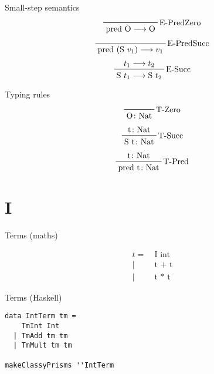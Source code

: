 \documentclass{beamer}
\begin{document}

\begin{frame}[c]
  Small-step semantics
  \begin{displaymath}  
    \prftree[r]{E-PredZero}
    {\text{pred O} \longrightarrow \text{O}}
  \end{displaymath}  
  \begin{displaymath}  
    \prftree[r]{E-PredSucc}
    {\text{pred (S $v_1$)} \longrightarrow \text{$v_1$}}
  \end{displaymath}  
  \begin{displaymath}  
    \prftree[r]{E-Succ}
    {t_1 \longrightarrow t_2}
    {\text{S $t_1$} \longrightarrow \text{S $t_2$}}
  \end{displaymath}  
\end{frame}

\begin{frame}
  Typing rules
  \begin{displaymath}  
    \prftree[r]{T-Zero}
    {\text{O} \colon \text{Nat}}
  \end{displaymath}  
  \begin{displaymath}  
    \prftree[r]{T-Succ}
    {\text{t} \colon \text{Nat}}
    {\text{S t} \colon \text{Nat}}
  \end{displaymath}  
  \begin{displaymath}  
    \prftree[r]{T-Pred}
    {\text{t} \colon \text{Nat}}
    {\text{pred t} \colon \text{Nat}}
  \end{displaymath}  
\end{frame}

\section{I}

\begin{frame}[c]
  \begin{center}
Terms (maths) 
  \end{center}
  \begin{displaymath}
    \begin{aligned}
t =& \ \text{I int} \\
  |& \ \text{t + t} \\
  |& \ \text{t * t}
    \end{aligned}
  \end{displaymath}
\end{frame}

\begin{frame}[fragile]
  \begin{center}
Terms (Haskell) 
  \end{center}
  \begin{verbatim}
data IntTerm tm =
    TmInt Int
  | TmAdd tm tm
  | TmMult tm tm

makeClassyPrisms ''IntTerm
  \end{verbatim}
\end{frame} 
\end{document}
